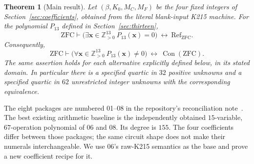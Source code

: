 \documentclass[11pt,a4paper]{article}
\newtheorem{theorem}{Theorem}[section]
\theoremstyle{remark}\newtheorem{remark}[theorem]{Remark}
\newcommand{\Pos}{\mathbb Z_{>0}}
\newcommand{\Con}{\operatorname{Con}}
\begin{document}
\begin{theorem}[Main result]\label{thm:main}
Let $(\beta,K_0,M_C,M_F)$ be the four fixed integers of
Section~\ref{sec:coefficients}, obtained from the literal blank-input K215
machine. For the polynomial $P_{13}$ defined in
Section~\ref{sec:thirteen},
\[
 \mathrm{ZFC}\vdash
 \bigl(\exists\mathbf x\in\Pos^{13}\ P_{13}(\mathbf x)=0\bigr)
 \ \longleftrightarrow\ \mathrm{Ref}_{\mathrm{ZFC}}.
\]
Consequently,
\[
 \boxed{\quad\mathrm{ZFC}\vdash
 \bigl(\forall\mathbf x\in\Pos^{13}\ P_{13}(\mathbf x)\ne0\bigr)
 \ \longleftrightarrow\ \Con(\mathrm{ZFC}).\quad}
\]
The same assertion holds for each alternative explicitly defined below,
in its stated domain. In particular there is a specified quartic in
$32$ positive unknowns and a specified quartic in $62$ unrestricted
integer unknowns with the corresponding equivalence.
\end{theorem}

The eight packages are numbered 01--08 in the repository's reconciliation
note~\cite{catalogue}. The best existing arithmetic baseline is the
independently obtained $15$-variable, $67$-operation polynomial of 06
and 08. Its degree is $155$. The four coefficients differ between those
packages; the same circuit shape does not make their numerals
interchangeable. We use 06's raw-K215 semantics as the base and prove a
new coefficient recipe for it.
\end{document}
